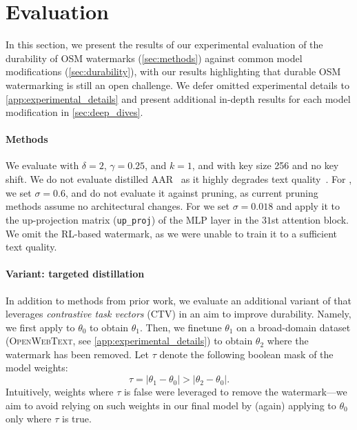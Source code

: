 \section{Evaluation}
\label{sec:eval}


In this section, we present the results of our experimental evaluation of the durability of OSM watermarks (\cref{sec:methods}) against common model modifications (\cref{sec:durability}), with our results highlighting that durable OSM watermarking is still an open challenge.
We defer omitted experimental details to \cref{app:experimental_details} and present additional in-depth results for each model modification in \cref{sec:deep_dives}. 

\paragraph{Methods}
We evaluate \KGW with $\delta = 2$, $\gamma = 0.25$, and $k = 1$, and \KTH with key size 256 and no key shift.
We do not evaluate distilled AAR~\citep{aar} as it highly degrades text quality~\citep{learnability}.
For \unremovable, we set $\sigma = 0.6$, and do not evaluate it against pruning, as current pruning methods assume no architectural changes. 
For \gaussmark we set $\sigma = 0.018$ and apply it to the up-projection matrix (\texttt{up\_proj}) of the MLP layer in the $31$st attention block.
We omit the RL-based watermark, as we were unable to train it to a sufficient text quality.

\paragraph{Variant: targeted distillation}
In addition to methods from prior work, we evaluate an additional variant of \KGW that leverages \emph{contrastive task vectors} (\textsc{CTV}) \citep{task_vector, ctv} in an aim to improve durability.
Namely, we first apply \KGW to $\theta_0$ to obtain $\theta_1$. 
Then, we finetune $\theta_1$ on a broad-domain dataset (\textsc{OpenWebText}, see \cref{app:experimental_details}) to obtain $\theta_2$ where the watermark has been removed.
Let $\tau$ denote the following boolean mask of the model weights: 
\begin{equation}
    \label{eq:ctv}
    \tau = |\theta_1 - \theta_0| > |\theta_2 - \theta_0|.
\end{equation}
Intuitively, weights where $\tau$ is false were leveraged to remove the watermark---we aim to avoid relying on such weights in our final model by (again) applying \KGW to $\theta_0$ only where $\tau$ is true. 

